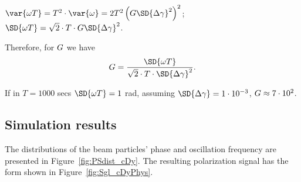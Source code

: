 \documentclass{article}
\begin{document}
$\var{\omega T} = T^2\cdot \var{\omega} = 2T^2\bkt{\wycoef\SD{\dy}^2}^2$; $\SD{\omega T} = \sqrt{2}\cdot T\cdot \wycoef\SD{\dy}^2$.

Therefore, for $G$ we have
\begin{equation}
	\wycoef = \frac{\SD{\omega T}}{\sqrt{2}\cdot T\cdot \SD{\dy}^2}.
\end{equation}

If in $T=1000$ secs $\SD{\omega T} = 1$ rad, assuming $\SD{\dy} = \vp{1}{-3}$, $G \approx {7}\cdot 10^{2}$.

\subsection{Simulation results}
The distributions of the beam particles' phase and oscillation frequency are presented in Figure~\ref{fig:PSdist_cDy}. The resulting polarization signal has the form shown in Figure~\ref{fig:Sgl_cDyPhys}.
\end{document}
